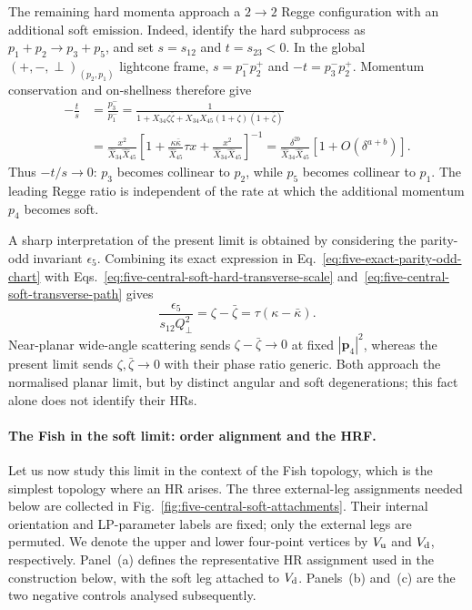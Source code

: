 \documentclass[a4paper,11pt]{article}
\begin{document}
The remaining hard momenta approach a \(2\to2\) Regge configuration with
an additional soft emission.  Indeed, identify the hard subprocess as
\(p_1+p_2\to p_3+p_5\), and set \(s=s_{12}\) and \(t=s_{23}<0\).
In the global \((+,-,\perp)_{(p_2,p_1)}\) lightcone frame,
\(s=p_1^-p_2^+\) and \(-t=p_3^-p_2^+\).  Momentum conservation and
on-shellness therefore give
\begin{align}
 -\frac{t}{s}
 &=\frac{p_3^-}{p_1^-}
 =\frac{1}{1+X_{34}\zeta\bar\zeta
              +X_{34}X_{45}(1+\zeta)(1+\bar\zeta)}\nonumber\\
 &=\frac{x^2}{\widehat X_{34}\widehat X_{45}}
 \left[1+\frac{\kappa\bar\kappa}{\widehat X_{45}}\tau x
          +\frac{x^2}{\widehat X_{34}\widehat X_{45}}\right]^{-1}
 =\frac{\delta^{2b}}{\widehat X_{34}\widehat X_{45}}
  \left[1+O(\delta^{a+b})\right].
 \label{eq:five-central-soft-regge-ratio}
\end{align}
Thus \(-t/s\to0\): \(p_3\) becomes collinear to \(p_2\), while \(p_5\)
becomes collinear to \(p_1\).  The leading Regge ratio is independent of
the rate at which the additional momentum \(p_4\) becomes soft.

A sharp interpretation of the present limit is obtained by considering the
parity-odd invariant \(\epsilon_5\).  Combining its exact expression in
Eq.~\eqref{eq:five-exact-parity-odd-chart} with
Eqs.~\eqref{eq:five-central-soft-hard-transverse-scale}
and~\eqref{eq:five-central-soft-transverse-path} gives
\begin{equation}
 \frac{\epsilon_5}{s_{12}Q_\perp^2}
 =\zeta-\bar\zeta
 =\tau(\kappa-\bar\kappa).
 \label{eq:five-central-soft-gram}
\end{equation}
Near-planar wide-angle scattering sends \(\zeta-\bar\zeta\to0\) at fixed
\(|\mathbf p_4|^2\), whereas the present limit sends
\(\zeta,\bar\zeta\to0\) with their phase ratio generic.  Both approach the
normalised planar limit, but by distinct angular and soft degenerations;
this fact alone does not identify their HRs.

\paragraph{The Fish in the soft limit: order alignment and the HRF.}

Let us now study this limit in the context of the Fish topology, which is the
simplest topology where an HR arises.  The three external-leg assignments
needed below are collected in
Fig.~\ref{fig:five-central-soft-attachments}.  Their internal orientation and
LP-parameter labels are fixed; only the external legs are permuted.  We denote
the upper and lower four-point vertices by \(V_{\rm u}\) and \(V_{\rm d}\),
respectively.  Panel~(a) defines the representative HR assignment used in the
construction below, with the soft leg attached to \(V_{\rm d}\).  Panels~(b)
and~(c) are the two negative controls analysed subsequently.
\end{document}
